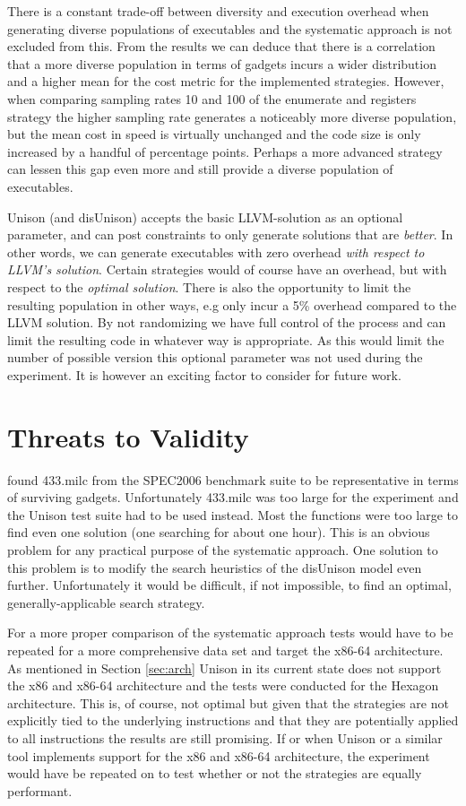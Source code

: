 There is a constant trade-off between diversity and execution overhead when generating
diverse populations of executables and the systematic approach is not excluded from this.
From the results we can deduce that there is a correlation that a more diverse population
in terms of gadgets incurs a wider distribution and a higher mean for the cost metric for
the implemented strategies. However, when comparing sampling rates 10 and 100 of the
enumerate and registers strategy the higher sampling rate generates a noticeably more
diverse population, but the mean cost in speed is virtually unchanged and the code size is
only increased by a handful of percentage points. Perhaps a more advanced strategy can
lessen this gap even more and still provide a diverse population of executables.

Unison (and disUnison) accepts the basic LLVM-solution as an optional parameter, and can
post constraints to only generate solutions that are \textit{better}. In other words, we
can generate executables with zero overhead \textit{with respect to LLVM's solution}.
Certain strategies would of course have an overhead, but with respect to the
\textit{optimal solution}. There is also the opportunity to limit the resulting population
in other ways, e.g only incur a 5\% overhead compared to the LLVM solution. By not
randomizing we have full control of the process and can limit the resulting code in
whatever way is appropriate. As this would limit the number of possible version this
optional parameter was not used during the experiment. It is however an exciting factor
to consider for future work.

\section{Threats to Validity}

\textcite{large-scale-automated} found 433.milc from the SPEC2006 benchmark suite to be
representative in terms of surviving gadgets. Unfortunately 433.milc was too large for the
experiment and the Unison test suite had to be used instead. Most the functions were too
large to find even one solution (one searching for about one hour). This is an obvious
problem for any practical purpose of the systematic approach. One solution to this problem
is to modify the search heuristics of the disUnison model even further. Unfortunately it
would be difficult, if not impossible, to find an optimal, generally-applicable search
strategy.

For a more proper comparison of the systematic approach tests would have to be repeated for
a more comprehensive data set and target the x86-64 architecture. As mentioned in Section
\ref{sec:arch} Unison in its current state does not support the x86 and x86-64
architecture and the tests were conducted for the Hexagon architecture. This is, of course,
not optimal but given that the strategies are not explicitly tied to the underlying
instructions and that they are potentially applied to all instructions the results are
still promising. If or when Unison or a similar tool implements support for the x86 and
x86-64 architecture, the experiment would have be repeated on to test whether or not the
strategies are equally performant.

